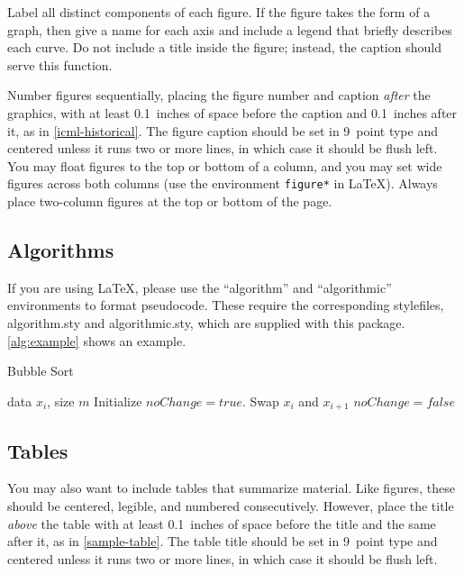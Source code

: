 \documentclass[nohyperref]{article}
\theoremstyle{plain}
\theoremstyle{definition}
\theoremstyle{remark}
\begin{document}
Label all distinct components of each figure. If the figure takes the
form of a graph, then give a name for each axis and include a legend
that briefly describes each curve. Do not include a title inside the
figure; instead, the caption should serve this function.

Number figures sequentially, placing the figure number and caption
\emph{after} the graphics, with at least 0.1~inches of space before
the caption and 0.1~inches after it, as in
\cref{icml-historical}. The figure caption should be set in
9~point type and centered unless it runs two or more lines, in which
case it should be flush left. You may float figures to the top or
bottom of a column, and you may set wide figures across both columns
(use the environment \texttt{figure*} in \LaTeX). Always place
two-column figures at the top or bottom of the page.

\subsection{Algorithms}

If you are using \LaTeX, please use the ``algorithm'' and ``algorithmic''
environments to format pseudocode. These require
the corresponding stylefiles, algorithm.sty and
algorithmic.sty, which are supplied with this package.
\cref{alg:example} shows an example.

\begin{algorithm}[tb]
   \caption{Bubble Sort}
   \label{alg:example}
\begin{algorithmic}
    data $x_i$, size $m$
   \REPEAT
   \STATE Initialize $noChange = true$.
   \STATE Swap $x_i$ and $x_{i+1}$
   \STATE $noChange = false$
   \ENDIF
   \ENDFOR
\end{algorithmic}
\end{algorithm}

\subsection{Tables}

You may also want to include tables that summarize material. Like
figures, these should be centered, legible, and numbered consecutively.
However, place the title \emph{above} the table with at least
0.1~inches of space before the title and the same after it, as in
\cref{sample-table}. The table title should be set in 9~point
type and centered unless it runs two or more lines, in which case it
should be flush left.
\end{document}

